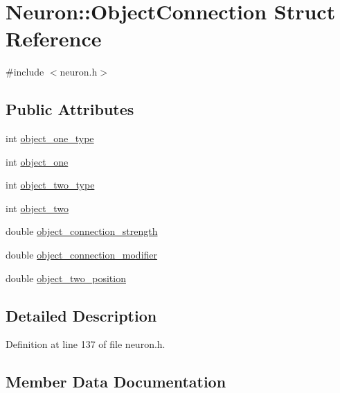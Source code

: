 \hypertarget{struct_neuron_1_1_object_connection}{}\section{Neuron\+:\+:Object\+Connection Struct Reference}
\label{struct_neuron_1_1_object_connection}


{\ttfamily \#include $<$neuron.\+h$>$}

\subsection*{Public Attributes}
\begin{DoxyCompactItemize}
\item 
int \hyperlink{struct_neuron_1_1_object_connection_a6174f20de091bf9942b14550890f122d}{object\+\_\+one\+\_\+type}
\item 
int \hyperlink{struct_neuron_1_1_object_connection_af6bdcfe97aee7b1d47788f92fa57a7a8}{object\+\_\+one}
\item 
int \hyperlink{struct_neuron_1_1_object_connection_a69d9c1f11a36f759b6aef68236b4cd93}{object\+\_\+two\+\_\+type}
\item 
int \hyperlink{struct_neuron_1_1_object_connection_a457a80615d216a9db5e90159294bed48}{object\+\_\+two}
\item 
double \hyperlink{struct_neuron_1_1_object_connection_aaad352b3f1e712aff929a8c2fc370ac1}{object\+\_\+connection\+\_\+strength}
\item 
double \hyperlink{struct_neuron_1_1_object_connection_a52bbd1a5fb20ee3e5e10c36002b4dcba}{object\+\_\+connection\+\_\+modifier}
\item 
double \hyperlink{struct_neuron_1_1_object_connection_a2dd04a4740d11779423a2ba5e94d8f5e}{object\+\_\+two\+\_\+position}
\end{DoxyCompactItemize}


\subsection{Detailed Description}


Definition at line 137 of file neuron.\+h.



\subsection{Member Data Documentation}
\mbox{\label{struct_neuron_1_1_object_connection_a52bbd1a5fb20ee3e5e10c36002b4dcba}} 

